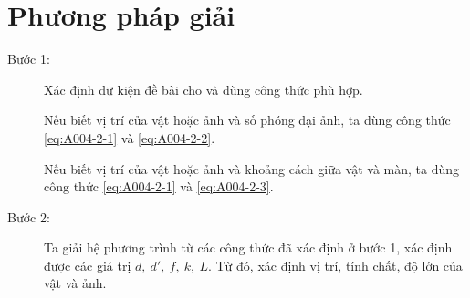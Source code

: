 \section{Phương pháp giải}
	\begin{description}
		\item[Bước 1:] Xác định dữ kiện đề bài cho và dùng công thức phù hợp.
		
		Nếu biết vị trí của vật hoặc ảnh và số phóng đại ảnh, ta dùng công thức \eqref{eq:A004-2-1} và \eqref{eq:A004-2-2}. 
		
		Nếu biết vị trí của vật hoặc ảnh và khoảng cách giữa vật và màn, ta dùng công thức \eqref{eq:A004-2-1} và \eqref{eq:A004-2-3}.  
		
		\item[Bước 2:] Ta giải hệ phương trình từ các công thức đã xác định ở bước 1, xác định được các giá trị $d,\ d',\ f,\ k,\ L$. Từ đó, xác định vị trí, tính chất, độ lớn của vật và ảnh. 
		
	\end{description}

